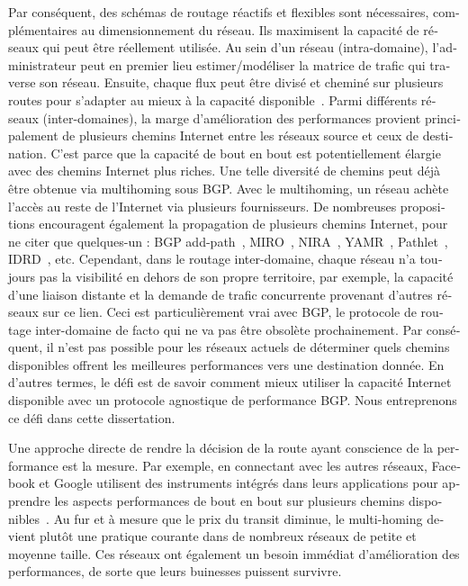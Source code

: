\begin{otherlanguage}{french}
Par conséquent, des schémas de routage réactifs et flexibles sont nécessaires, complémentaires au dimensionnement du réseau.
Ils maximisent la capacité de réseaux qui peut être réellement utilisée.
Au sein d'un réseau (intra-domaine), l'administrateur peut en premier lieu estimer/modéliser la matrice de trafic qui traverse son réseau. 
Ensuite, chaque flux peut être divisé et cheminé sur plusieurs routes pour s'adapter au mieux à la capacité disponible~\cite{Xu2011, Jain2013}.
Parmi différents réseaux (inter-domaines), la marge d'amélioration des performances provient principalement de plusieurs chemins Internet 
entre les réseaux source et ceux de destination.
C'est parce que la capacité de bout en bout est potentiellement élargie avec des chemins Internet plus riches.
Une telle diversité de chemins peut déjà être obtenue via multihoming sous \acf{BGP}. 
Avec le multihoming, un réseau achète l'accès au reste de l'Internet via plusieurs fournisseurs.
De nombreuses propositions encouragent également la propagation de plusieurs chemins Internet, 
pour ne citer que quelques-un : BGP add-path~\cite{addpath}, MIRO~\cite{Xu2006}, NIRA~\cite{Yang2007}, YAMR~\cite{Ganichev2010 }, Pathlet~\cite{Godfrey09}, IDRD~\cite{Misseri2013}, etc.
Cependant, dans le routage inter-domaine, chaque réseau n'a toujours pas la visibilité en dehors de son propre territoire, 
par exemple, la capacité d'une liaison distante et la demande de trafic concurrente  provenant d'autres réseaux sur ce lien.
Ceci est particulièrement vrai avec \ac{BGP}, le protocole de routage inter-domaine de facto qui ne va pas être obsolète prochainement.
Par conséquent, il n'est pas possible pour les réseaux actuels de déterminer quels chemins disponibles offrent les meilleures performances vers une destination donnée.
En d'autres termes, le défi est de savoir comment mieux utiliser la capacité Internet disponible avec un protocole agnostique de performance \ac{BGP}.
Nous entreprenons ce défi dans cette dissertation.

Une approche directe de rendre la décision de la route ayant conscience de la performance est la mesure. 
Par exemple, en connectant avec les autres réseaux, Facebook et Google utilisent des instruments intégrés dans leurs applications 
pour apprendre les aspects performances de bout en bout sur plusieurs chemins disponibles~\cite{Yap2017, Schlinker2017}.
Au fur et à mesure que le prix du transit diminue, le multi-homing devient plutôt une pratique courante dans de nombreux réseaux de petite et moyenne taille.
Ces réseaux ont également un besoin immédiat d'amélioration des performances, de sorte que leurs buinesses puissent survivre.


\end{otherlanguage}
